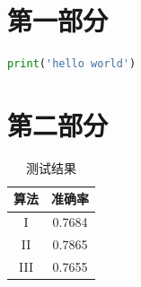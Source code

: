 \documentclass[a4paper,12pt]{report}
\begin{document}
\begin{appendix}

\chapter{第一部分}

\begin{lstlisting}[language=python]
print('hello world') 
\end{lstlisting}

\chapter{第二部分}

\begin{table}[]
    \centering
    \caption{测试结果}
    \label{tab:my-table}
    \begin{tabular}{@{}cc@{}}
    \toprule
    算法 & 准确率 \\ \midrule
    I & 0.7684 \\
    II & 0.7865 \\
    III & 0.7655 \\ \bottomrule
    \end{tabular}
\end{table}

\end{appendix}
\end{document}
